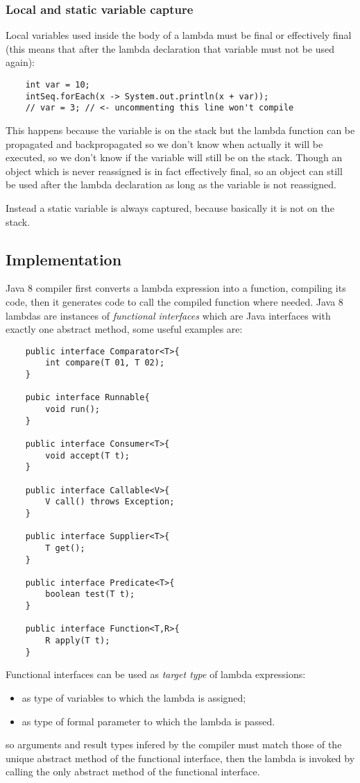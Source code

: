 \subsubsection{Local and static variable capture}
Local variables used inside the body of a lambda must be final or effectively final (this means that after the lambda declaration that variable must not be used again):
\begin{verbatim}
    int var = 10;
    intSeq.forEach(x -> System.out.println(x + var));
    // var = 3; // <- uncommenting this line won't compile
\end{verbatim}
This happens because the variable is on the stack but the lambda function can be propagated and backpropagated so we don't know when actually it will be executed, so we don't know if the variable will still be on the stack.
Though an object which is never reassigned is in fact effectively final, so an object can still be used after the lambda declaration as long as the variable is not reassigned.

Instead a static variable is always captured, because basically it is not on the stack.

\subsection{Implementation}
Java 8 compiler first converts a lambda expression into a function, compiling its code, then it generates code to call the compiled function where needed.
Java 8 lambdas are instances of \emph{functional interfaces} which are Java interfaces with exactly one abstract method, some useful examples are:
\begin{verbatim}
    public interface Comparator<T>{
        int compare(T 01, T 02);
    }

    pubic interface Runnable{
        void run();
    }

    public interface Consumer<T>{
        void accept(T t);
    }

    public interface Callable<V>{
        V call() throws Exception;
    }

    public interface Supplier<T>{
        T get();
    }

    public interface Predicate<T>{
        boolean test(T t); 
    }

    public interface Function<T,R>{
        R apply(T t);
    }
\end{verbatim}

Functional interfaces can be used as \emph{target type} of lambda expressions:
\begin{itemize}
    \item as type of variables to which the lambda is assigned;
    \item as type of formal parameter to which the lambda is passed.
\end{itemize}
so arguments and result types infered by the compiler must match those of the unique abstract method of the functional interface, then the lambda is invoked by calling the only abstract method of the functional interface.

